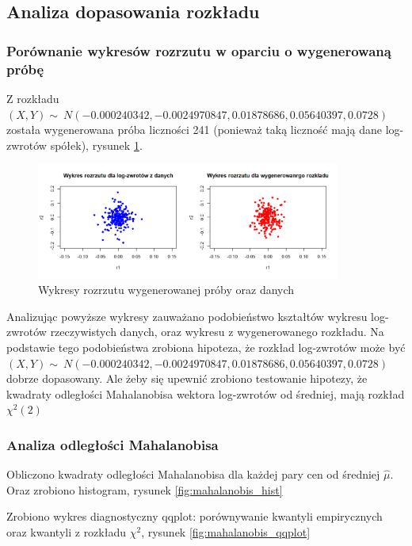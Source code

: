\documentclass[a4paper,11pt]{article}
\begin{document}
\subsection{Analiza dopasowania rozkładu}
\subsubsection{Porównanie wykresów rozrzutu w oparciu o wygenerowaną próbę}
Z rozkładu $(X, Y) \sim\ N(-0.000240342, -0.0024970847, 0.01878686, 0.05640397, 0.0728)$ została wygenerowana próba liczności 241 (ponieważ taką liczność mają dane log-zwrotów spółek), rysunek \ref{fig:wykresy_rozrzutu}.
\begin{figure}[!htb]
	\centering
	\includegraphics[width=10cm]{images/wykres_rozrzutu_porownanie.png}
	\caption{Wykresy rozrzutu wygenerowanej próby oraz danych }
         \label{fig:wykresy_rozrzutu}
\end{figure}
Analizując powyższe wykresy zauważano podobieństwo kształtów wykresu log-zwrotów rzeczywistych danych, oraz wykresu z wygenerowanego rozkładu. Na podstawie tego podobieństwa zrobiona hipoteza, że rozkład log-zwrotów może być $(X, Y) \sim\ N(-0.000240342, -0.0024970847, 0.01878686, 0.05640397, 0.0728)$ dobrze dopasowany. Ale żeby się upewnić zrobiono testowanie hipotezy, że kwadraty odległości Mahalanobisa wektora log-zwrotów od średniej, mają rozkład $ \chi^2(2)$

\subsubsection{Analiza odległości Mahalanobisa}

Obliczono kwadraty odległości Mahalanobisa dla każdej pary cen od średniej $ \hat{\mu} $. Oraz zrobiono histogram, rysunek \ref{fig:mahalanobis_hist}

Zrobiono wykres diagnostyczny qqplot: porównywanie kwantyli empirycznych oraz kwantyli z rozkładu $ \chi^2$, rysunek \ref{fig:mahalanobis_qqplot}
\end{document}
